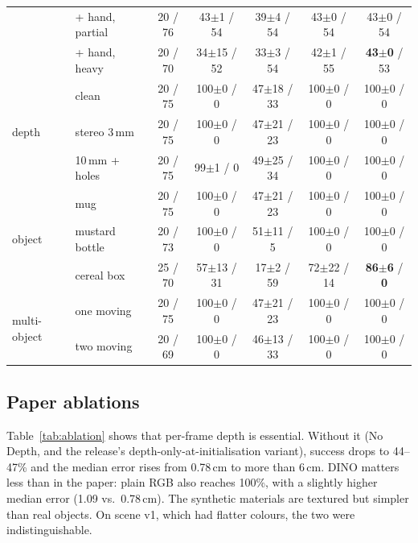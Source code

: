 \documentclass[10pt,a4paper]{article}
\newcommand{\best}[1]{\textbf{#1}}
\begin{document}
\begin{table}[t]
\begin{tabular}{llccccc}
 & + hand, partial & 20 / 76 & 43$\pm$1 / 54 & 39$\pm$4 / 54 & 43$\pm$0 / 54 & 43$\pm$0 / 54 \\
 & + hand, heavy   & 20 / 70 & 34$\pm$15 / 52 & 33$\pm$3 / 54 & 42$\pm$1 / 55 & \best{43$\pm$0} / 53 \\
\midrule
\multirow{3}{*}{depth}
 & clean           & 20 / 75 & 100$\pm$0 / 0 & 47$\pm$18 / 33 & 100$\pm$0 / 0 & 100$\pm$0 / 0 \\
 & stereo 3\,mm    & 20 / 75 & 100$\pm$0 / 0 & 47$\pm$21 / 23 & 100$\pm$0 / 0 & 100$\pm$0 / 0 \\
 & 10\,mm + holes  & 20 / 75 & 99$\pm$1 / 0 & 49$\pm$25 / 34 & 100$\pm$0 / 0 & 100$\pm$0 / 0 \\
\midrule
\multirow{3}{*}{object}
 & mug             & 20 / 75 & 100$\pm$0 / 0 & 47$\pm$21 / 23 & 100$\pm$0 / 0 & 100$\pm$0 / 0 \\
 & mustard bottle  & 20 / 73 & 100$\pm$0 / 0 & 51$\pm$11 / 5 & 100$\pm$0 / 0 & 100$\pm$0 / 0 \\
 & cereal box      & 25 / 70 & 57$\pm$13 / 31 & 17$\pm$2 / 59 & 72$\pm$22 / 14 & \best{86$\pm$6} / \best{0} \\
\midrule
\multirow{2}{*}{multi-object}
 & one moving      & 20 / 75 & 100$\pm$0 / 0 & 47$\pm$21 / 23 & 100$\pm$0 / 0 & 100$\pm$0 / 0 \\
 & two moving      & 20 / 69 & 100$\pm$0 / 0 & 46$\pm$13 / 33 & 100$\pm$0 / 0 & 100$\pm$0 / 0 \\
\bottomrule
\end{tabular}
\end{table}

\subsection{Paper ablations}

Table~\ref{tab:ablation} shows that per-frame depth is essential. Without it
(No Depth, and the release's depth-only-at-initialisation variant), success
drops to 44--47\% and the median error rises from 0.78\,cm to more than 6\,cm.
DINO matters less than in the paper: plain RGB also reaches 100\%, with a
slightly higher median error (1.09 vs.\ 0.78\,cm). The synthetic materials are
textured but simpler than real objects. On scene v1, which had flatter colours,
the two were indistinguishable.
\end{document}

